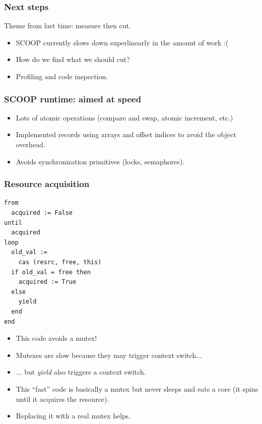 \documentclass{beamer}
\begin{document}
\begin{frame}
  \frametitle{Next steps}
  Theme from last time: measure then cut.
  \begin{itemize}[<+->]
  \item SCOOP currently slows down superlinearly in the amount of work :(
  \item How do we find what we should cut? 
  \item Profiling and code inspection.
  \end{itemize}
\end{frame}

\begin{frame}
  \frametitle{SCOOP runtime: aimed at speed}
  
  \begin{itemize}
  \item Lots of atomic operations (compare and swap, atomic increment, etc.)
  \item Implemented records using arrays and offset indices to 
    avoid the object overhead.
  \item Avoids synchronization primitives (locks, semaphores).
  \end{itemize}  
\end{frame}

\begin{frame}[fragile]
  \frametitle{Resource acquisition}
  
  \begin{minipage}[c]{0.45\linewidth}
  \begin{lstlisting}
from
  acquired := False
until 
  acquired
loop
  old_val :=
    cas (resrc, free, this)
  if old_val = free then
    acquired := True
  else
    yield
  end
end
  \end{lstlisting}
\end{minipage}
\begin{minipage}[c]{0.45\linewidth}
  \begin{itemize}[<+->]
  \item This code avoids a mutex!
  \item Mutexes are slow because they may trigger context switch...
  \item ... but \emph{yield} also triggers a context switch.
  \item This ``fast'' code is basically a mutex but never sleeps and
    eats a core (it spins until it acquires the resource).
  \item Replacing it with a real mutex helps.
  \end{itemize}
\end{minipage}
\end{frame}
\end{document}
